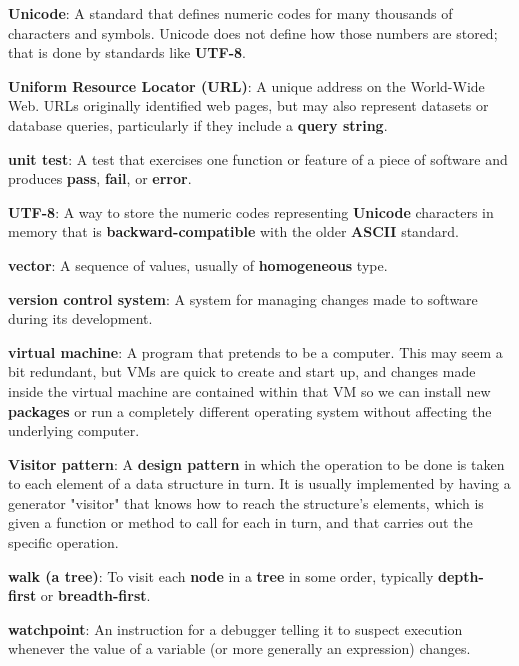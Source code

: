 \documentclass[krantzl]{krantz}
\newcommand{\glosskey}[1]{\textbf{#1}}
\begin{document}
\noindent \textbf{\glosskey{Unicode}}: 
A standard that defines numeric codes for many thousands of characters and symbols. Unicode does not define how those numbers are stored; that is done by standards like \glosskey{UTF-8}.


\noindent \textbf{\glosskey{Uniform Resource Locator} (URL)}: 
A unique address on the World-Wide Web. URLs originally identified web pages, but may also represent datasets or database queries, particularly if they include a \glosskey{query string}.


\noindent \textbf{\glosskey{unit test}}: 
A test that exercises one function or feature of a piece of software and produces \glosskey{pass}, \glosskey{fail}, or \glosskey{error}.


\noindent \textbf{\glosskey{UTF-8}}: 
A way to store the numeric codes representing \glosskey{Unicode} characters in memory that is \glosskey{backward-compatible} with the older \glosskey{ASCII} standard.


\noindent \textbf{\glosskey{vector}}: 
A sequence of values, usually of \glosskey{homogeneous} type.


\noindent \textbf{\glosskey{version control system}}: 
A system for managing changes made to software during its development.


\noindent \textbf{\glosskey{virtual machine}}: 
A program that pretends to be a computer. This may seem a bit redundant, but VMs are quick to create and start up, and changes made inside the virtual machine are contained within that VM so we can install new \glosskey{packages} or run a completely different operating system without affecting the underlying computer.


\noindent \textbf{\glosskey{Visitor pattern}}: 
A \glosskey{design pattern} in which the operation to be done is taken to each element of a data structure in turn. It is usually implemented by having a generator "visitor" that knows how to reach the structure's elements, which is given a function or method to call for each in turn, and that carries out the specific operation.


\noindent \textbf{\glosskey{walk (a tree)}}: 
To visit each \glosskey{node} in a \glosskey{tree} in some order, typically \glosskey{depth-first} or \glosskey{breadth-first}.


\noindent \textbf{\glosskey{watchpoint}}: 
An instruction for a debugger telling it to suspect execution whenever the value of a variable (or more generally an expression) changes.
\end{document}
